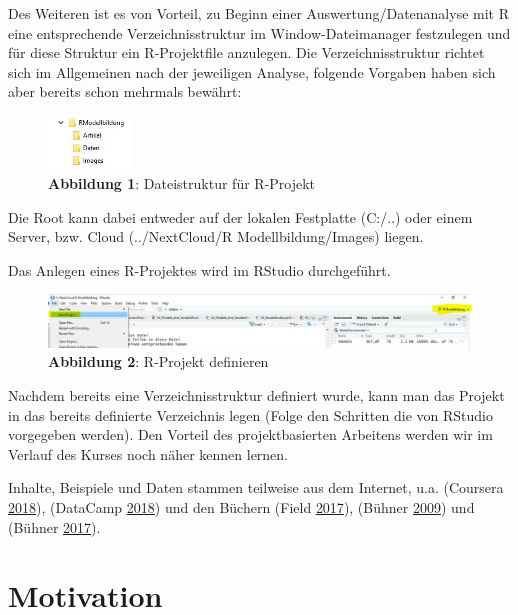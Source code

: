 \documentclass[]{article}
\begin{document}
Des Weiteren ist es von Vorteil, zu Beginn einer Auswertung/Datenanalyse
mit R eine entsprechende Verzeichnisstruktur im Window-Dateimanager
festzulegen und für diese Struktur ein R-Projektfile anzulegen. Die
Verzeichnisstruktur richtet sich im Allgemeinen nach der jeweiligen
Analyse, folgende Vorgaben haben sich aber bereits schon mehrmals
bewährt:

\begin{figure}
\centering
\includegraphics[width=0.20000\textwidth]{Images/Verzeichnisstruktur.JPG}
\caption{\textbf{Abbildung 1}: Dateistruktur für R-Projekt}
\end{figure}

Die Root kann dabei entweder auf der lokalen Festplatte (C:/..) oder
einem Server, bzw. Cloud (../NextCloud/R Modellbildung/Images) liegen.

Das Anlegen eines R-Projektes wird im RStudio durchgeführt.

\begin{figure}
\centering
\includegraphics[width=1.00000\textwidth]{Images/Projektdefinieren.JPG}
\caption{\textbf{Abbildung 2}: R-Projekt definieren}
\end{figure}

Nachdem bereits eine Verzeichnisstruktur definiert wurde, kann man das
Projekt in das bereits definierte Verzeichnis legen (Folge den Schritten
die von RStudio vorgegeben werden). Den Vorteil des projektbasierten
Arbeitens werden wir im Verlauf des Kurses noch näher kennen lernen.

Inhalte, Beispiele und Daten stammen teilweise aus dem Internet, u.a.
(Coursera \protect\hyperlink{ref-CourseRa}{2018}), (DataCamp
\protect\hyperlink{ref-DataCamp}{2018}) und den Büchern (Field
\protect\hyperlink{ref-Field}{2017}), (Bühner
\protect\hyperlink{ref-Buehner1}{2009}) und (Bühner
\protect\hyperlink{ref-Buehner2}{2017}).

\section*{Motivation}\label{motivation}
\end{document}
